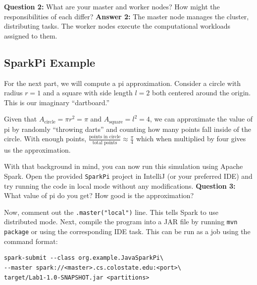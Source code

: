 \documentclass[11pt,letterpaper]{article}
\begin{document}
\noindent
\textbf{Question 2:} What are your master and worker nodes? How might the responsibilities of each differ?
\textbf{Answer 2:} The master node manages the cluster, distributing tasks. The worker nodes execute the computational workloads assigned to them.
\vspace{1in}

\subsection{SparkPi Example}

For the next part, we will compute a pi approximation. Consider a circle with radius $r=1$ and a square with side length $l=2$ both centered around the origin. This is our imaginary ``dartboard.''

\begin{center}
\end{center}

Given that $A_{\mathrm{circle}}=\pi r^2=\pi$ and $A_{\mathrm{square}}=l^2=4$, we can approximate the value of pi by randomly ``throwing darts'' and counting how many points fall inside of the circle. With enough points, $\frac{\text{points in circle}}{\text{total points}}\approx\frac{\pi}{4}$ which when multiplied by four gives us the approximation.

With that background in mind, you can now run this simulation using Apache Spark. Open the provided \texttt{SparkPi} project in IntelliJ (or your preferred IDE) and try running the code in local mode without any modifications.
\newpage
\noindent
\textbf{Question 3:} What value of pi do you get? How good is the approximation?
\vspace{1in}

Now, comment out the \texttt{.master("local")} line. This tells Spark to use distributed mode. Next, compile the program into a JAR file by running \texttt{mvn package} or using the corresponding IDE task. This can be run as a job using the command format:

\begin{verbatim}
spark-submit --class org.example.JavaSparkPi\
--master spark://<master>.cs.colostate.edu:<port>\
target/Lab1-1.0-SNAPSHOT.jar <partitions>
\end{verbatim}
\end{document}
